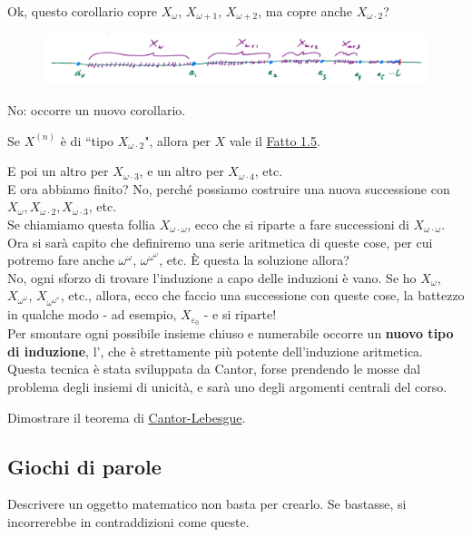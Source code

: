 Ok, questo corollario copre $X_\omega$, $X_{\omega + 1}$, $X_{\omega + 2}$, ma copre anche $X_{\omega \cdot 2}$?

\begin{figure}[H]
		\centering
		\includegraphics[scale = 0.3]{immagini/2omega.png}
\end{figure}

No: occorre un nuovo corollario.

\begin{corollary}
Se $X^{(n)}$ è di ``tipo $X_{\omega \cdot 2}$", allora per $X$ vale il \hyperref[unicità]{Fatto 1.5}.
\end{corollary}

E poi un altro per $X_{\omega \cdot 3}$, e un altro per $X_{\omega \cdot 4}$, etc.\\
E ora abbiamo finito? No, perché possiamo costruire una nuova successione con $X_{\omega},X_{\omega \cdot 2},X_{\omega \cdot 3}$, etc.\\
Se chiamiamo questa follia $X_{\omega \cdot \omega}$, ecco che si riparte a fare successioni di $X_{\omega \cdot \omega}$. Ora si sarà capito che definiremo
una serie aritmetica di queste cose, per cui potremo fare anche $\omega^\omega$, $\omega^{\omega^{\omega}}$, etc. È questa la soluzione allora?\\
No, ogni sforzo di trovare l'induzione a capo delle induzioni è vano. Se ho $X_{\omega}$, $X_{\omega^\omega}$, $X_{\omega^{\omega^{\omega}}}$, etc., allora,
ecco che faccio una successione con queste cose, la battezzo in qualche modo - ad esempio, $X_{\varepsilon_0}$ - e si riparte!\\
Per smontare ogni possibile insieme chiuso e numerabile occorre un \textbf{nuovo tipo di induzione}, l', che è strettamente più potente dell'induzione aritmetica.
Questa tecnica è stata sviluppata da Cantor, forse prendendo le mosse dal problema degli insiemi di unicità, e sarà uno degli argomenti centrali del corso.

\begin{exercise}
Dimostrare il teorema di \hyperref[CL]{Cantor-Lebesgue}.
\end{exercise}

\subsection{Giochi di parole}
Descrivere un oggetto matematico non basta per crearlo. Se bastasse, si incorrerebbe in contraddizioni come queste.
